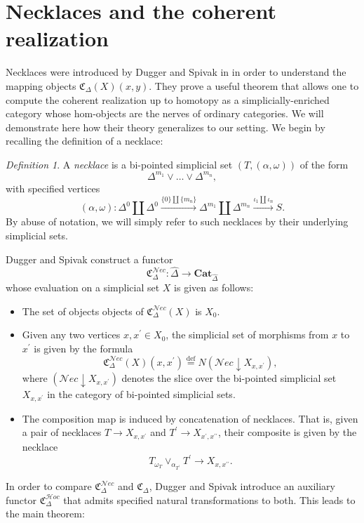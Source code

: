 \documentclass{amsart}
\numberwithin{equation}{section}
\theoremstyle{plain}   %
\theoremstyle{remark}
\newtheorem{defn}[subsection]{Definition}
\theoremstyle{plain}
\newcommand{\Nec}{\ensuremath{{\mathcal{N}ec}}}
\newcommand{\Hoc}{\ensuremath{{\mathcal{H}oc}}}
\newcommand{\Cat}{\ensuremath{\mathbf{Cat}}}
\newcommand{\overcat}[2]{{\left(#1\downarrow #2\right)}}
\newcommand{\psh}[1]{\ensuremath{\widehat{#1}}}
\newcommand{\defeq}{\overset{\mathrm{def}}=}
\begin{document}
\section{Necklaces and the coherent realization}
Necklaces were introduced by Dugger and Spivak in \cite{ds1} in order to understand the mapping objects \(\mathfrak{C}_\Delta(X)(x,y)\).  They prove a useful theorem that allows one to compute the coherent realization up to homotopy as a simplicially-enriched category whose hom-objects are the nerves of ordinary categories.  We will demonstrate here how their theory generalizes to our setting. We begin by recalling the definition of a necklace:

\begin{defn}
	A \emph{necklace} is a bi-pointed simplicial set \((T,(\alpha,\omega))\) of the form
	\[
		\Delta^{m_1} \vee \dots \vee \Delta^{m_n},
	\]
	with specified vertices 
	\[(\alpha,\omega):\Delta^0\coprod \Delta^0 \xrightarrow{\{0\}\coprod \{m_n\}} \Delta^{m_1} \coprod \Delta^{m_n}\xrightarrow{\iota_1\coprod \iota_n} S.\]
	By abuse of notation, we will simply refer to such necklaces by their underlying simplicial sets.
\end{defn}

Dugger and Spivak construct a functor
\[
	\mathfrak{C}^{\Nec}_\Delta: \psh{\Delta}\to \Cat_{\psh{\Delta}}
\]
whose evaluation on a simplicial set \(X\) is given as follows:
\begin{itemize}
	\item The set of objects objects of \(\mathfrak{C}^{\Nec}_\Delta(X)\) is \(X_0\).
	\item Given any two vertices \(x,x^\prime\in X_0\), the simplicial set of morphisms from \(x\) to \(x^\prime\) is given by the formula 
	\[
		\mathfrak{C}^{\Nec}_\Delta(X)(x,x^\prime)\defeq N\overcat{\Nec}{X_{x,x^\prime}},
	\]
	where \(\overcat{\Nec}{X_{x,x^\prime}}\) denotes the slice over the bi-pointed simplicial set \(X_{x,x^\prime}\) in the category of bi-pointed simplicial sets.  
	\item The composition map is induced by concatenation of necklaces.  That is, given a pair of necklaces \(T\to X_{x,x^\prime}\) and \(T^\prime\to X_{x^\prime,x^{\prime\prime}}\), their composite is given by the necklace 
	\[
		T {}_{\omega_T}\vee_{\alpha_{T^\prime}} T^\prime \to X_{x,x^{\prime\prime}}.
	\]
\end{itemize}

In order to compare \(\mathfrak{C}^{\Nec}_\Delta\) and \(\mathfrak{C}_\Delta\), Dugger and Spivak introduce an auxiliary functor \(\mathfrak{C}^{\Hoc}_\Delta\) that admits specified natural transformations to both.  This leads to the main theorem:
\end{document}

